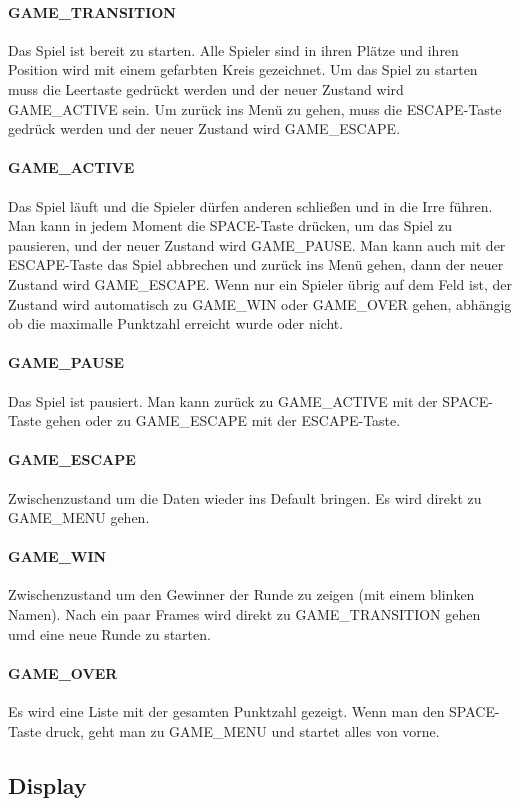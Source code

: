 \documentclass[doktyp=studarbeit]{TUBAFarbeiten}
\begin{document}
\paragraph{GAME\_TRANSITION}
Das Spiel ist bereit zu starten. Alle Spieler sind in ihren Plätze und ihren
Position wird mit einem gefarbten Kreis gezeichnet. Um das Spiel zu starten
muss die Leertaste gedrückt werden und der neuer Zustand wird GAME\_ACTIVE sein.
Um zurück ins Menü zu gehen, muss die ESCAPE-Taste gedrück werden und der neuer
Zustand wird GAME\_ESCAPE.
\paragraph{GAME\_ACTIVE}
Das Spiel läuft und die Spieler dürfen anderen schließen und in die Irre führen.
Man kann in jedem Moment die SPACE-Taste drücken, um das Spiel zu pausieren,
und der neuer Zustand wird GAME\_PAUSE. Man kann auch mit der ESCAPE-Taste das
Spiel abbrechen und zurück ins Menü gehen, dann der neuer Zustand wird 
GAME\_ESCAPE. Wenn nur ein Spieler übrig auf dem Feld ist, der Zustand wird 
automatisch zu GAME\_WIN oder GAME\_OVER gehen, abhängig ob die maximalle 
Punktzahl erreicht wurde oder nicht.
\paragraph{GAME\_PAUSE}
Das Spiel ist pausiert. Man kann zurück zu GAME\_ACTIVE mit der SPACE-Taste
gehen oder zu GAME\_ESCAPE mit der ESCAPE-Taste.
\paragraph{GAME\_ESCAPE}
Zwischenzustand um die Daten wieder ins Default bringen. Es wird direkt zu 
GAME\_MENU gehen.
\paragraph{GAME\_WIN}
Zwischenzustand um den Gewinner der Runde zu zeigen (mit einem blinken Namen).
Nach ein paar Frames wird direkt zu GAME\_TRANSITION gehen umd eine neue Runde
zu starten. 
\paragraph{GAME\_OVER}
Es wird eine Liste mit der gesamten Punktzahl gezeigt. Wenn man den SPACE-Taste
druck, geht man zu GAME\_MENU und startet alles von vorne.

\subsection{Display}
\end{document}
